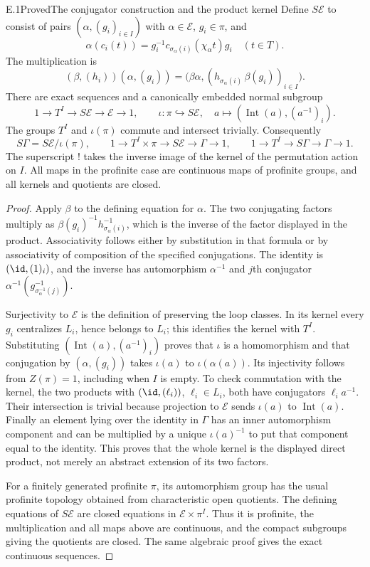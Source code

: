 \begin{claim}{E.1}{Proved}{The conjugator construction and the product kernel}
Define $S\mathcal E$ to consist of pairs $(\alpha,(g_i)_{i\in I})$
with $\alpha\in\mathcal E$, $g_i\in\pi$, and
\[
 \alpha(c_i(t))=g_i^{-1}c_{\sigma_\alpha(i)}(\chi_\alpha t)g_i
 \quad(t\in T).
\]
The multiplication is
\[
 (\beta,(h_i))(\alpha,(g_i))
 =\bigl(\beta\alpha,
       (h_{\sigma_\alpha(i)}\,\beta(g_i))_{i\in I}\bigr).
\]
There are exact sequences and a canonically embedded normal subgroup
\[
 1\to T^I\to S\mathcal E\to\mathcal E\to1,
 \qquad
 \iota:\pi\hookrightarrow S\mathcal E,
 \quad a\mapsto(\operatorname{Int}(a),(a^{-1})_i).
\]
The groups $T^I$ and $\iota(\pi)$ commute and intersect trivially.
Consequently
\[
 S\Gamma=S\mathcal E/\iota(\pi),\qquad
 1\to T^I\times\pi\to S\mathcal E\to\Gamma\to1,
 \qquad 1\to T^I\to S\Gamma\to\Gamma\to1.
\]
The superscript $!$ takes the inverse image of the kernel of the
permutation action on $I$. All maps in the profinite case are continuous
maps of profinite groups, and all kernels and quotients are closed.
\end{claim}
\begin{proof}
Apply $\beta$ to the defining equation for $\alpha$. The two
conjugating factors multiply as
$\beta(g_i)^{-1}h_{\sigma_\alpha(i)}^{-1}$, which is the inverse of the
factor displayed in the product. Associativity follows either by
substitution in that formula or by associativity of composition of the
specified conjugations. The identity is $(\id,(1)_i)$, and the inverse
has automorphism $\alpha^{-1}$ and $j$th conjugator
$\alpha^{-1}(g_{\sigma_\alpha^{-1}(j)}^{-1})$.

Surjectivity to $\mathcal E$ is the definition of preserving the loop
classes. In its kernel every $g_i$ centralizes $L_i$, hence belongs to
$L_i$; this identifies the kernel with $T^I$. Substituting
$(\operatorname{Int}(a),(a^{-1})_i)$ proves that $\iota$ is a
homomorphism and that conjugation by $(\alpha,(g_i))$ takes $\iota(a)$
to $\iota(\alpha(a))$. Its injectivity follows from $Z(\pi)=1$, including
when $I$ is empty. To check commutation with the kernel, the two products
with $(\id,(\ell_i))$, $\ell_i\in L_i$, both have conjugators
$\ell_i a^{-1}$. Their intersection is trivial because projection to
$\mathcal E$ sends $\iota(a)$ to $\operatorname{Int}(a)$. Finally an
element lying over the identity in $\Gamma$ has an inner automorphism
component and can be multiplied by a unique $\iota(a)^{-1}$ to put that
component equal to the identity. This proves that the whole kernel is
the displayed direct product, not merely an abstract extension of its
two factors.

For a finitely generated profinite $\pi$, its automorphism group has the
usual profinite topology obtained from characteristic open quotients.
The defining equations of $S\mathcal E$ are closed equations in
$\mathcal E\times\pi^I$. Thus it is profinite, the multiplication and
all maps above are continuous, and the compact subgroups giving the
quotients are closed. The same algebraic proof gives the exact
continuous sequences.
\end{proof}

